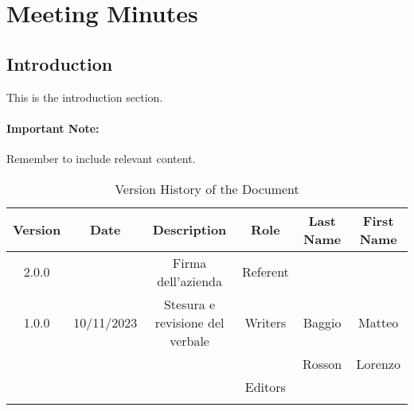 \documentclass{article}
\begin{document}
\section{Meeting Minutes}

\subsection{Introduction}

This is the introduction section.

\paragraph{Important Note:} Remember to include relevant content.

\begin{table}[H]
\centering
\caption{Version History of the Document}
\label{tab:scrittori-redattori}
\begin{tabular}{|c|c|c|c|c|c|}
\hline
\textbf{Version} & \textbf{Date} & \textbf{Description} & \textbf{Role} & \textbf{Last Name} & \textbf{First Name} \\
\hline
2.0.0 & & Firma dell'azienda & Referent & & \\
\hline
1.0.0 & 10/11/2023 & Stesura e revisione del verbale & Writers & Baggio & Matteo \\
& & & & Rosson & Lorenzo \\
\hline
& & & Editors & & \\
& & & & & \\
\hline
\end{tabular}
\end{table}
\end{document}
